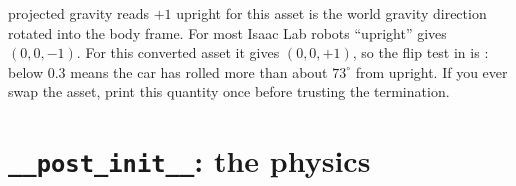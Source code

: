 \begin{warnbox}{projected gravity reads $+1$ upright for this asset}
 is the world gravity direction rotated into the
body frame. For most Isaac Lab robots ``upright'' gives $(0,0,-1)$. For this
converted asset it gives $(0,0,+1)$, so the flip test in
 is : below
$0.3$ means the car has rolled more than about $73^\circ$ from upright. If
you ever swap the asset, print this quantity once before trusting the
termination.
\end{warnbox}

\section{\texttt{\_\_post\_init\_\_}: the physics}


